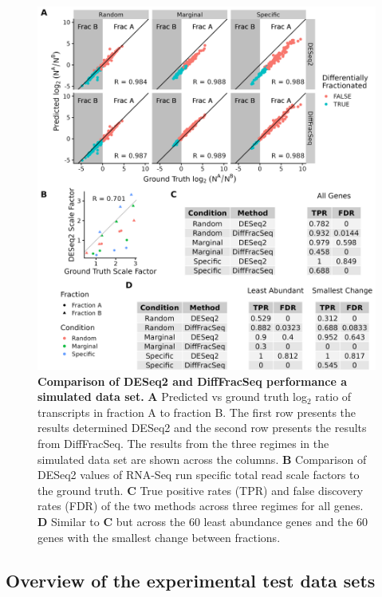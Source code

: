 \documentclass[../main.tex]{subfiles}
\begin{document}
\begin{figure}

{\centering \includegraphics[width=1\linewidth]{figures/DESeq_vs_bayesian_combined.png} 

}

\caption[DiffFracSeq vs DESeq2 performance on the simulated data set.]{\textbf{Comparison of DESeq2 and DiffFracSeq performance a simulated data set.} \textbf{A} Predicted vs ground truth log$_2$ ratio of transcripts in fraction A to fraction B. The first row presents the results determined DESeq2 and the second row presents the results from DiffFracSeq. The results from the three regimes in the simulated data set are shown across the columns. \textbf{B} Comparison of DESeq2 values of RNA-Seq run specific total read scale factors to the ground truth. \textbf{C} True positive rates (TPR) and false discovery rates (FDR) of the two methods across three regimes for all genes. \textbf{D} Similar to \textbf{C} but across the 60 least abundance genes and the 60 genes with the smallest change between fractions.} \label{fig:simulated-data-results}
\end{figure}

\subsection{Overview of the experimental test data sets}
\end{document}
